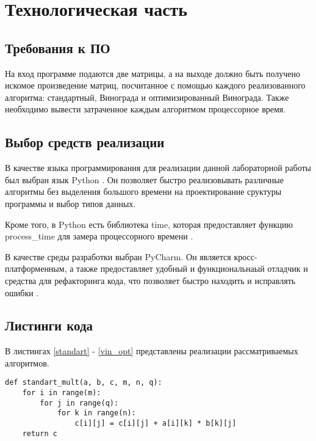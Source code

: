 \chapter{Технологическая часть}

\section{Требования к ПО}

На вход программе подаются две матрицы, а на выходе должно быть получено искомое произведение матриц, посчитанное с помощью каждого реализованного алгоритма: стандартный, Винограда и оптимизированный Винограда. Также необходимо вывести затраченное каждым алгоритмом процессорное время.

\section{Выбор средств реализации}

В качестве языка программирования для реализации данной лабораторной работы был выбран язык Python  \cite{PythonBook}. Он позволяет быстро реализовывать различные алгоритмы без выделения большого времени на проектирование сруктуры программы и выбор типов данных. 

Кроме того, в Python есть библиотека time, которая предоставляет функцию process\_time для замера процессорного времени \cite{process_time_text}.

В качестве среды разработки выбран PyCharm. Он является кросс-платформенным, а также предоставляет удобный и функциональнаый отладчик и средства для рефакторинга кода, что позволяет быстро находить и исправлять ошибки \cite{pycharm}.

\section{Листинги кода}

В листингах \ref{standart} - \ref{vin_opt} представлены реализации рассматриваемых алгоритмов.

\clearpage
\begin{lstlisting}[caption=Стандартный алгоритм умножения матриц,
	label={standart}]
def standart_mult(a, b, c, m, n, q):
	for i in range(m):
		for j in range(q):
			for k in range(n):
				c[i][j] = c[i][j] + a[i][k] * b[k][j]
	return c
\end{lstlisting}

